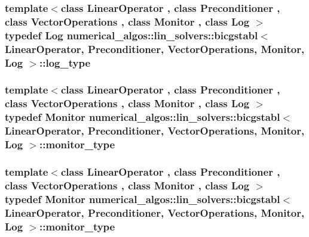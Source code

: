 \hypertarget{classnumerical__algos_1_1lin__solvers_1_1bicgstabl_af655ab52679d5d959cccf86e56a33d63}{
\subsubsection[{log\-\_\-type}]{\setlength{\rightskip}{0pt plus 5cm}template$<$class Linear\-Operator , class Preconditioner , class Vector\-Operations , class Monitor , class Log $>$ typedef Log {\bf numerical\-\_\-algos\-::lin\-\_\-solvers\-::bicgstabl}$<$ Linear\-Operator, Preconditioner, Vector\-Operations, Monitor, Log $>$\-::{\bf log\-\_\-type}}}\label{classnumerical__algos_1_1lin__solvers_1_1bicgstabl_af655ab52679d5d959cccf86e56a33d63}
\hypertarget{classnumerical__algos_1_1lin__solvers_1_1bicgstabl_a220cc0b13fdb1f9cbd9dcbfc6aaaccd8}{
\subsubsection[{monitor\-\_\-type}]{\setlength{\rightskip}{0pt plus 5cm}template$<$class Linear\-Operator , class Preconditioner , class Vector\-Operations , class Monitor , class Log $>$ typedef Monitor {\bf numerical\-\_\-algos\-::lin\-\_\-solvers\-::bicgstabl}$<$ Linear\-Operator, Preconditioner, Vector\-Operations, Monitor, Log $>$\-::{\bf monitor\-\_\-type}}}\label{classnumerical__algos_1_1lin__solvers_1_1bicgstabl_a220cc0b13fdb1f9cbd9dcbfc6aaaccd8}
\hypertarget{classnumerical__algos_1_1lin__solvers_1_1bicgstabl_a220cc0b13fdb1f9cbd9dcbfc6aaaccd8}{
\subsubsection[{monitor\-\_\-type}]{\setlength{\rightskip}{0pt plus 5cm}template$<$class Linear\-Operator , class Preconditioner , class Vector\-Operations , class Monitor , class Log $>$ typedef Monitor {\bf numerical\-\_\-algos\-::lin\-\_\-solvers\-::bicgstabl}$<$ Linear\-Operator, Preconditioner, Vector\-Operations, Monitor, Log $>$\-::{\bf monitor\-\_\-type}}}\label{classnumerical__algos_1_1lin__solvers_1_1bicgstabl_a220cc0b13fdb1f9cbd9dcbfc6aaaccd8}
